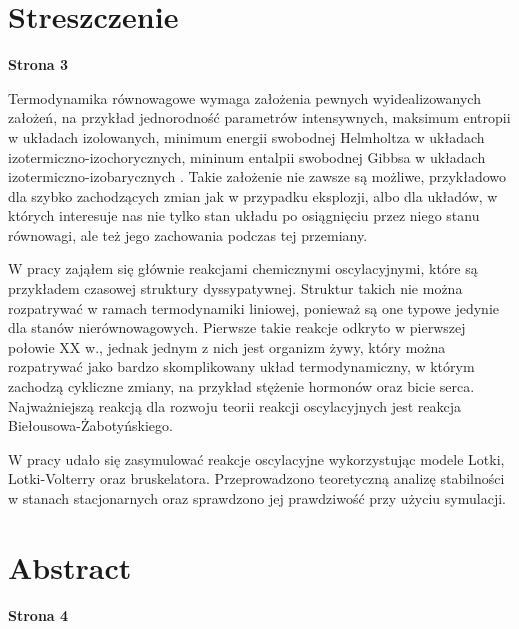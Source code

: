 \documentclass[10pt, a4paper, twoside, onecolumn]{article}
\numberwithin{equation}{section}
\begin{document}
	\section*{Streszczenie}
	\begin{center}
		\textbf{Strona 3}
	\end{center}
	Termodynamika równowagowe wymaga założenia pewnych wyidealizowanych założeń, na przykład jednorodność parametrów intensywnych, maksimum entropii w układach izolowanych, minimum energii swobodnej Helmholtza w układach izotermiczno-izochorycznych, mininum entalpii swobodnej Gibbsa w układach izotermiczno-izobarycznych \cite{pudlik}. Takie założenie nie zawsze są możliwe, przykładowo dla szybko zachodzących zmian jak w przypadku eksplozji, albo dla układów, w których interesuje nas nie tylko stan układu po osiągnięciu przez niego stanu równowagi, ale też jego zachowania podczas tej przemiany. \par
	W pracy zająłem się głównie reakcjami chemicznymi oscylacyjnymi, które są przykładem czasowej struktury dyssypatywnej. Struktur takich nie można rozpatrywać w ramach termodynamiki liniowej, ponieważ są one typowe jedynie dla stanów nierównowagowych. Pierwsze takie reakcje odkryto w pierwszej połowie XX w., jednak jednym z nich jest organizm żywy, który można rozpatrywać jako bardzo skomplikowany układ termodynamiczny, w którym zachodzą cykliczne zmiany, na przykład stężenie hormonów oraz bicie serca. Najważniejszą reakcją dla rozwoju teorii reakcji oscylacyjnych jest reakcja Biełousowa-Żabotyńskiego. \par
	W pracy udało się zasymulować reakcje oscylacyjne wykorzystując modele Lotki, Lotki-Volterry oraz bruskelatora. Przeprowadzono teoretyczną analizę stabilności w stanach stacjonarnych oraz sprawdzono jej prawdziwość przy użyciu symulacji. 
	\pagebreak
	
	\section*{Abstract}
	\begin{center}
		\textbf{Strona 4}
	\end{center}
	\pagebreak
	
\end{document}
